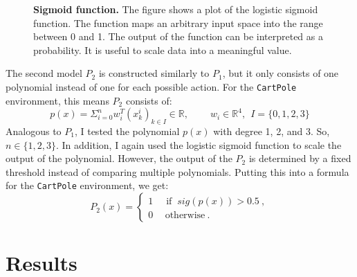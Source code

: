 \begin{figure}[ht]
\centering
{}
\caption[Sigmoid function]{
  \textbf{Sigmoid function.}
  The figure shows a plot of the logistic sigmoid function. The function maps an arbitrary input space into the range between 0 and 1. The output of the function can be interpreted as a probability. It is useful to scale data into a meaningful value.
}
\label{fig:sigmoid}
\end{figure}


The second model $P_2$ is constructed similarly to $P_1$, but it only consists of one polynomial instead of one for each possible action. For the \verb|CartPole| environment, this means $P_2$ consists of:
\[
  p(x) = \Sigma_{i=0}^{n} w_i^T (x_k^i)_{k \in I} \in \mathbb{R}, \ \ \ \ \ \ \ \ \ \ w_i \in \mathbb{R}^4, \ \ I = \{0, 1, 2, 3\}
\]
Analogous to $P_1$, I tested the polynomial $p(x)$ with degree 1, 2, and 3. So, $n \in \{1, 2, 3\}$. In addition, I again used the logistic sigmoid function to scale the output of the polynomial. However, the output of the $P_2$ is determined by a fixed threshold instead of comparing multiple polynomials. Putting this into a formula for the \verb|CartPole| environment, we get:
\[
  P_2(x) =
  \begin{cases}1~&{\text{ if }}~sig(p(x))>0.5~,\\0~&~\text{otherwise}~.\end{cases}
\]


\section{Results}
